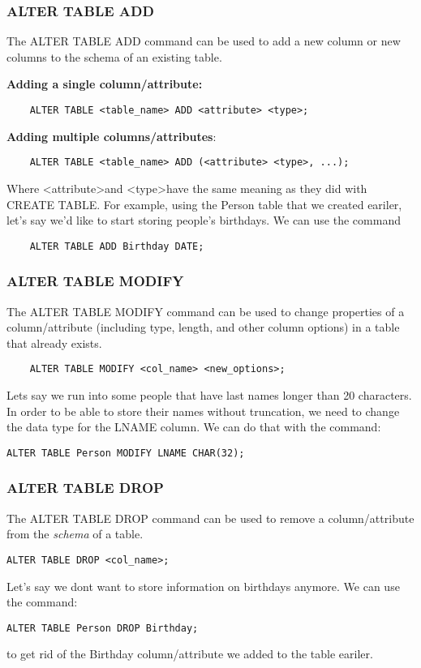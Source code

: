 \documentclass{report}
\begin{document}
\subsubsection*{ALTER TABLE ADD}
The ALTER TABLE ADD command can be used to add a new column or new columns to the schema of an existing table.
\item \textbf{Adding a single column/attribute:}
    \begin{verbatim}
    ALTER TABLE <table_name> ADD <attribute> <type>; 
    \end{verbatim}
\item \textbf{Adding multiple columns/attributes}:
    \begin{verbatim}
    ALTER TABLE <table_name> ADD (<attribute> <type>, ...); 
    \end{verbatim}
    Where \textless attribute\textgreater and \textless type\textgreater have the same meaning as they did with CREATE TABLE.
    For example, using the Person table that we created eariler, let's say we'd like to start storing people's birthdays. We can use the command
    \begin{verbatim}
    ALTER TABLE ADD Birthday DATE;
    \end{verbatim}
    \subsubsection*{ALTER TABLE MODIFY}
    The ALTER TABLE MODIFY command can be used to change properties of a column/attribute (including type, length, and other column options) in a table that already exists.
    \begin{verbatim}
    ALTER TABLE MODIFY <col_name> <new_options>; 
    \end{verbatim}
Lets say we run into some people that have last names longer than 20 characters. In order to be able to store their names without truncation, we need to change the data type for the LNAME column. We can do that with the command:
\begin{verbatim}
ALTER TABLE Person MODIFY LNAME CHAR(32);
\end{verbatim}
\subsubsection*{ALTER TABLE DROP}
The ALTER TABLE DROP command can be used to remove a column/attribute from the \textit{schema} of a table.
\begin{verbatim}
ALTER TABLE DROP <col_name>;
\end{verbatim}
Let's say we dont want to store information on birthdays anymore. We can use the command:
\begin{verbatim}
ALTER TABLE Person DROP Birthday;
\end{verbatim}
to get rid of the Birthday column/attribute we added to the table eariler.
\end{document}
